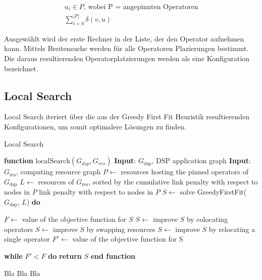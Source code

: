 \documentclass{article}
\begin{document}
\[ 
    \begin{gathered}
        u_i \in P \text{, wobei P = angepinnten Operatoren} \\
        \sum_{i=0}^{|P|} \delta(v, u)
    \end{gathered} 
\] 

Ausgewählt wird der erste Rechner in der Liste, der den Operator aufnehmen kann. 
Mittels Breitensuche werden für alle Operatoren Plazierungen bestimmt. Die daraus resultierenden Operatorplatzierungen werden als eine Konfiguration bezeichnet. 



\subsection{Local Search}
Local Search iteriert über die aus der Greedy First Fit Heuristik resultierenden Konfigurationen, um somit optimalere Lösungen zu finden. 


\begin{minipage}{0.5\textwidth}
    \begin{algorithm}[H]
        \caption{Local Search}
        \begin{algorithmic}
            \STATE \textbf{function} $\mathrm{localSearch}(G_{dsp}, G_{res})$
            \STATE \textbf{Input}: $G_{\text{dsp}}$, DSP application graph
            \STATE \textbf{Input}: $G_{\text{res}}$, computing resource graph
            \STATE $P \leftarrow$ resources hosting the pinned operators of $G_{\text{dsp}}$
            \STATE $L \leftarrow$ resources of $G_{\text{res}}$, 
            sorted by the cumulative link penalty with respect to nodes in $P$
            \STATE link penalty with respect to nodes in $P$
            \STATE $S \leftarrow$  solve GreedyFirstFit($G_{\text{dsp}}$, $L$)
            \STATE \textbf{do}
    
            \STATE \hspace{\algorithmicindent} $F \leftarrow$  value of the objective function for $S$
            \STATE \hspace{\algorithmicindent} $S \leftarrow$  improve $S$ by colocating operators
            \STATE \hspace{\algorithmicindent} $S \leftarrow$  improve $S$ by swapping resources
            \STATE \hspace{\algorithmicindent} $S \leftarrow$  improve $S$ by relocating a single operator
            \STATE \hspace{\algorithmicindent} $F' \leftarrow$ value of the objective function for S
    
            \STATE \textbf{while} $F'  < F$ \textbf{do}
            \STATE \hspace{\algorithmicindent} \textbf{return} $S$
            \STATE \textbf{end function}
        \end{algorithmic}
\end{algorithm}
\end{minipage}
    \begin{minipage}{0.5\textwidth}
    Bla Bla Bla
\end{minipage}
\end{document}
